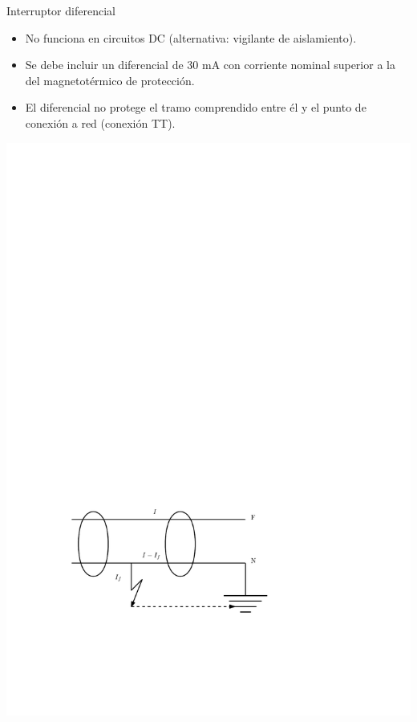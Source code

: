 \documentclass[xcolor={usenames,svgnames,dvipsnames}]{beamer}
\begin{document}
\begin{frame}[label={sec:orgc41d4b3}]{Interruptor diferencial}
\begin{itemize}
\item \alert{No funciona en circuitos DC} (alternativa: vigilante de
aislamiento).

\item Se debe incluir un diferencial de 30 mA con corriente nominal
superior a la del magnetotérmico de protección.

\item El diferencial \alert{no protege el tramo comprendido entre él y el punto
de conexión a red} (conexión TT).
\end{itemize}
\begin{center}
\includegraphics[height=0.3\textheight]{../figs/InterruptorDiferencial.pdf}
\end{center}
\end{frame}
\end{document}
